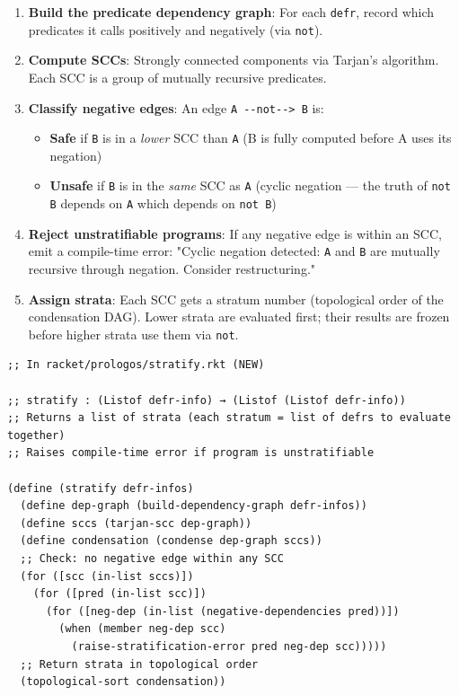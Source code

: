 \documentclass[11pt]{article}
\begin{document}
\begin{enumerate}
\item \textbf{Build the predicate dependency graph}: For each \texttt{defr}, record which
predicates it calls positively and negatively (via \texttt{not}).

\item \textbf{Compute SCCs}: Strongly connected components via Tarjan's algorithm.
Each SCC is a group of mutually recursive predicates.

\item \textbf{Classify negative edges}: An edge \texttt{A -{}-{}not-{}-{}> B} is:
\begin{itemize}
\item \textbf{Safe} if \texttt{B} is in a \emph{lower} SCC than \texttt{A} (B is fully computed before
A uses its negation)
\item \textbf{Unsafe} if \texttt{B} is in the \emph{same} SCC as \texttt{A} (cyclic negation — the
truth of \texttt{not B} depends on \texttt{A} which depends on \texttt{not B})
\end{itemize}

\item \textbf{Reject unstratifiable programs}: If any negative edge is within an SCC,
emit a compile-time error: "Cyclic negation detected: \texttt{A} and \texttt{B} are
mutually recursive through negation. Consider restructuring."

\item \textbf{Assign strata}: Each SCC gets a stratum number (topological order of
the condensation DAG). Lower strata are evaluated first; their results
are frozen before higher strata use them via \texttt{not}.
\end{enumerate}

\begin{verbatim}
;; In racket/prologos/stratify.rkt (NEW)

;; stratify : (Listof defr-info) → (Listof (Listof defr-info))
;; Returns a list of strata (each stratum = list of defrs to evaluate together)
;; Raises compile-time error if program is unstratifiable

(define (stratify defr-infos)
  (define dep-graph (build-dependency-graph defr-infos))
  (define sccs (tarjan-scc dep-graph))
  (define condensation (condense dep-graph sccs))
  ;; Check: no negative edge within any SCC
  (for ([scc (in-list sccs)])
    (for ([pred (in-list scc)])
      (for ([neg-dep (in-list (negative-dependencies pred))])
        (when (member neg-dep scc)
          (raise-stratification-error pred neg-dep scc)))))
  ;; Return strata in topological order
  (topological-sort condensation))
\end{verbatim}
\end{document}
